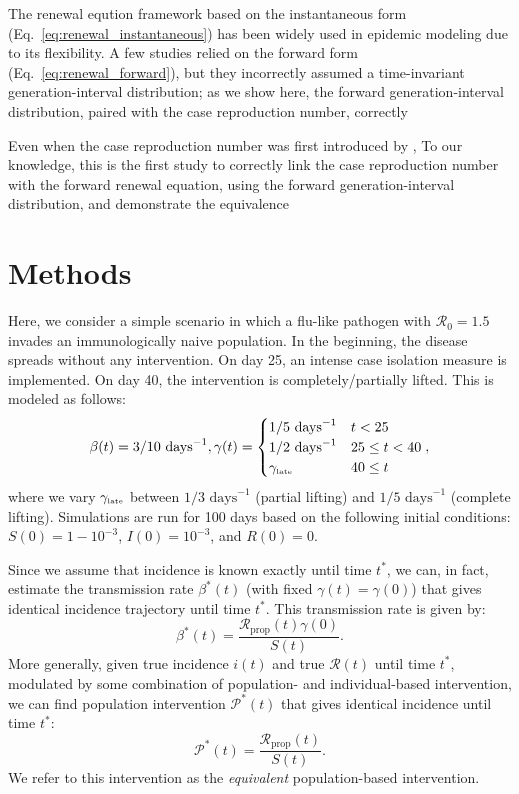 \documentclass[12pt]{article}
\newcommand{\eref}[1]{Eq.~\ref{eq:#1}}
\newcommand{\Rx}[1]{\ensuremath{{\mathcal R}_{#1}}\xspace}
\newcommand{\Ro}{\Rx{0}}
\newcommand{\RR}{\ensuremath{{\mathcal R}}\xspace}
\newcommand{\Rprop}{\Rx{\mathrm{prop}}}
\newcommand{\tsub}[2]{#1_{{\textrm{\tiny #2}}}}
\newcommand{\PP}{{\mathcal P}}
\begin{document}
The renewal eqution framework based on the instantaneous form (\eref{renewal_instantaneous}) has been widely used in epidemic modeling due to its flexibility.
A few studies relied on the forward form (\eref{renewal_forward}), but they incorrectly assumed a time-invariant generation-interval distribution;
as we show here, the forward generation-interval distribution, paired with the case reproduction number, correctly 


Even when the case reproduction number was first introduced by \cite{wallinga2004different}, 
To our knowledge, this is the first study to correctly link the case reproduction number with the forward renewal equation, using the forward generation-interval distribution, and demonstrate the equivalence 


\section{Methods}


Here, we consider a simple scenario in which a flu-like pathogen with $\Ro = 1.5$ invades an immunologically naive population.
In the beginning, the disease spreads without any intervention.
On day 25, an intense case isolation measure is implemented. 
On day 40, the intervention is completely/partially lifted.
This is modeled as follows:
\begin{equation}
\beta(t) = 3/10\,\,\textrm{days}^{-1}, \gamma(t) = \begin{cases}
1/5\,\, \textrm{days}^{-1} & t < 25\\
1/2\,\, \textrm{days}^{-1} & 25 \leq t < 40 \\
\tsub{\gamma}{late} & 40 \leq t
\end{cases},
\end{equation}
where we vary $\tsub{\gamma}{late}$ between $1/3\,\, \textrm{days}^{-1}$ (partial lifting) and $1/5\,\, \textrm{days}^{-1}$ (complete lifting).
Simulations are run for 100 days based on the following initial conditions: $S(0) = 1 - 10^{-3}$, $I(0) = 10^{-3}$, and $R(0) = 0$.

Since we assume that incidence is known exactly until time $t^\ast$, we can, in fact, estimate the transmission rate $\beta^\ast(t)$ (with fixed $\gamma(t)=\gamma(0)$) that gives identical incidence trajectory until time $t^\ast$.
This transmission rate is given by:
\begin{equation}
\beta^\ast(t) = \frac{\Rprop(t)\gamma(0)}{S(t)}.
\end{equation}
More generally, given true incidence $i(t)$ and true $\RR(t)$ until time $t^\ast$, modulated by some combination of population- and individual-based intervention, we can find population intervention $\PP^\ast(t)$ that gives identical incidence until time $t^\ast$:
\begin{equation}
\PP^\ast(t) = \frac{\Rprop(t)}{S(t)}.
\end{equation}
We refer to this intervention as the \emph{equivalent} population-based intervention.


\end{document}
